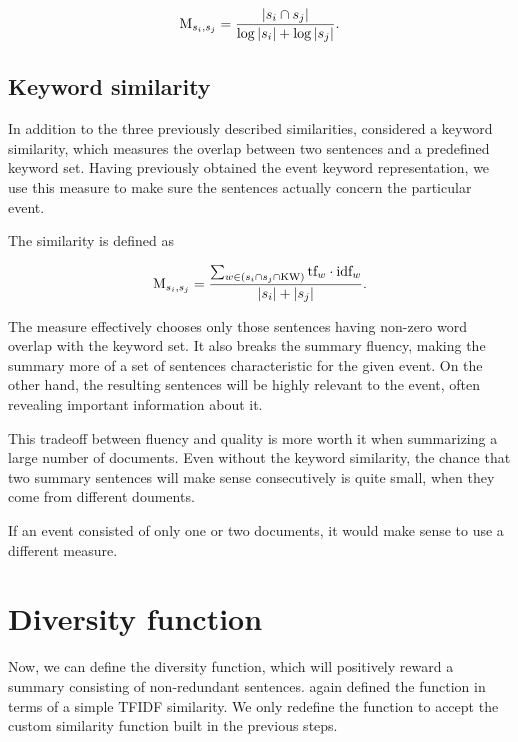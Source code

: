 \begin{equation}
	\text{M}_{s_{i}, s_{j}} = \frac{\left| s_{i} \cap s_{j} \right|}{\log{\left| s_{i} \right|} + \log{\left| s_{j} \right|}}.
\end{equation}


\subsection{Keyword similarity}

In addition to the three previously described similarities, \cite{mogren-2} considered a keyword similarity, which measures the overlap between two sentences and a predefined keyword set. Having previously obtained the event keyword representation, we use this measure to make sure the sentences actually concern the particular event.

The similarity is defined as 

\begin{equation}
	\text{M}_{s_{i}, s_{j}} = \frac{\sum_{w \in \left( s_{i} \cap s_{j} \cap \text{KW} \right)} \text{tf}_{w} \cdot \text{idf}_{w}}{\left| s_{i} \right| + \left| s_{j} \right|}.
\end{equation}

The measure effectively chooses only those sentences having non-zero word overlap with the keyword set. It also breaks the summary fluency, making the summary more of a set of sentences characteristic for the given event. On the other hand, the resulting sentences will be highly relevant to the event, often revealing important information about it.

This tradeoff between fluency and quality is more worth it when summarizing a large number of documents. Even without the keyword similarity, the chance that two summary sentences will make sense consecutively is quite small, when they come from different douments.

If an event consisted of only one or two documents, it would make sense to use a different measure.

\section{Diversity function}

Now, we can define the diversity function, which will positively reward a summary consisting of non-redundant sentences. \cite{multi-summarization-2} again defined the function in terms of a simple TFIDF similarity. We only redefine the function to accept the custom similarity function built in the previous steps.

